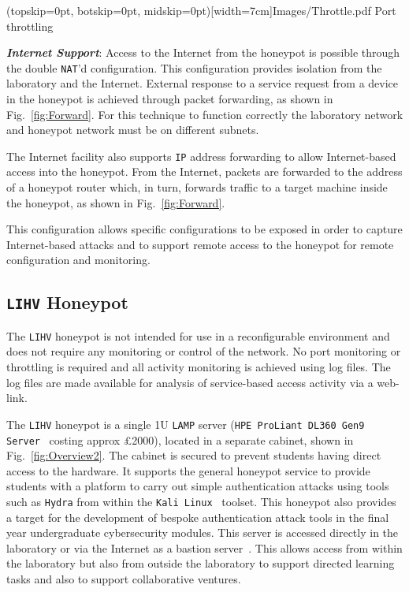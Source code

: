 \documentclass{ieeeaccess}
\begin{document}
\Figure[t!](topskip=0pt, botskip=0pt, midskip=0pt)[width=7cm]{Images/Throttle.pdf}
{Port throttling\label{fig:throttling}}


\noindent\textit{\textbf{Internet Support}}:
Access to the Internet from the honeypot is possible through the double
\texttt{NAT}'d configuration. This configuration provides isolation from the
laboratory and the Internet. External response to a service request from a
device in the honeypot is achieved through packet forwarding, as shown in
Fig.~\ref{fig:Forward}. For this technique to function correctly the laboratory
network and honeypot network must be on different subnets.

The Internet facility also supports \texttt{IP} address forwarding to allow
Internet-based access into the honeypot. From the Internet, packets are
forwarded to the address of a honeypot router which, in turn, forwards traffic
to a target machine inside the honeypot, as shown in Fig.~\ref{fig:Forward}.

This configuration allows specific configurations to be exposed in order to
capture Internet-based attacks and to support remote access to the honeypot for
remote configuration and monitoring.

\subsection{\texttt{LIHV} Honeypot}

The \texttt{LIHV} honeypot is not intended for use in a reconfigurable
environment and does not require any monitoring or control of the network. No
port monitoring or throttling is required and all activity monitoring is
achieved using log files. The log files are made available 
for analysis of service-based access activity via a web-link.

The \texttt{LIHV} honeypot is a single 1U \texttt{LAMP} server (\texttt{HPE
ProLiant DL360 Gen9 Server}~\cite{HPE:17} costing approx \pounds2000), located
in a separate cabinet, shown in Fig.~\ref{fig:Overview2}. The cabinet is
secured to prevent students having direct access to the hardware. It supports
the general honeypot service to provide students with a platform to carry out
simple authentication attacks using tools such as \texttt{Hydra} from within
the \texttt{Kali Linux}~\cite{OS:17} toolset. This honeypot also provides a
target for the development of bespoke authentication attack tools in the final
year undergraduate cybersecurity modules.  This server is accessed directly in
the laboratory or via the Internet as a bastion server~\cite{MB:05}. This
allows access from within the laboratory but also from outside the laboratory
to support directed learning tasks and also to support collaborative ventures.
\end{document}
